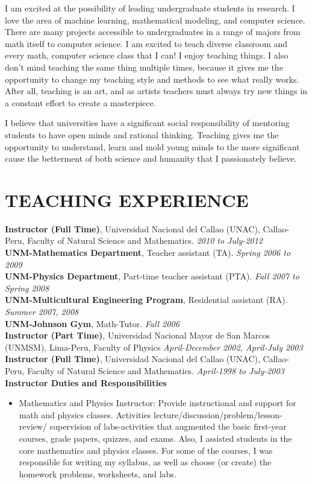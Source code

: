 \documentclass[a4paper, 11pt]{article}
\begin{document}
\begin{small}
I am excited at the possibility of leading undergraduate students in research. I love the area of machine learning, mathematical modeling, and computer science.
There are many projects accessible to undergraduates in a range of majors from math itself to computer science. 
I am excited to teach diverse classroom and every math, computer science class that I can! I enjoy teaching things.
I also don’t mind teaching the same thing multiple times, because it gives me the opportunity to change my teaching style and methods to see what really works.
After all, teaching is an art, and as artists teachers must always try new things in a constant effort to create a masterpiece.

I believe that universities have a significant social responsibility of
mentoring students to have open minds and rational thinking. 
Teaching gives me the opportunity to understand, learn and mold young minds to the more significant cause the betterment of both science and humanity that I passionately believe.

\section*{TEACHING EXPERIENCE} 
\textbf{Instructor (Full Time)}, Universidad Nacional del Callao (UNAC), Callao-Peru, Faculty of Natural Science and Mathematics. \hfill { \it 2010 to July-2012\/} \\
\textbf{UNM-Mathematics Department}, Teacher assistant (TA).  \hfill {\it Spring 2006 to 2009 \/}\\
\textbf{UNM-Physics Department}, Part-time teacher assistant (PTA). \hfill {\it Fall 2007 to Spring 2008\/}\\
\textbf{UNM-Multicultural Engineering Program}, Residential assistant (RA). \hfill {\it Summer 2007, 2008\/}\\
\textbf{UNM-Johnson Gym}, Math-Tutor. \hfill {\it Fall 2006\/} \\
\textbf{Instructor (Part Time)}, Universidad Nacional Mayor de San Marcos (UNMSM), Lima-Peru, Faculty of Physics \hfill {\it April-December 2002, April-July 2003\/} \\
\textbf{Instructor (Full Time)}, Universidad Nacional del Callao (UNAC), Callao-Peru, Faculty of Natural Science and Mathematics.  {\it April-1998 to July-2003\/} \\ 

\textbf{Instructor Duties and Responsibilities}
\begin{itemize}  \itemsep -2pt %
\item Mathematics and Physics Instructor: Provide instructional and support for math and physics classes. Activities lecture/discussion/problem/lesson-review/ supervision of labs-activities that augmented the basic first-year courses, grade papers,
quizzes, and exams. Also, I assisted students in the core mathematics
and physics classes. For some of the courses, I was responsible for writing my syllabus, as well as choose (or create) the homework problems, worksheets, and labs. 
\end{itemize}


\end{small}
\end{document}

